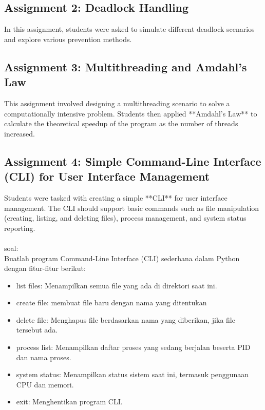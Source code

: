 \documentclass[12pt]{article}
\begin{document}
\subsection{Assignment 2: Deadlock Handling}
In this assignment, students were asked to simulate different deadlock scenarios and explore various prevention methods.

\subsection{Assignment 3: Multithreading and Amdahl's Law}
This assignment involved designing a multithreading scenario to solve a computationally intensive problem. Students then applied **Amdahl's Law** to calculate the theoretical speedup of the program as the number of threads increased.

\subsection{Assignment 4: Simple Command-Line Interface (CLI) for User Interface Management}
Students were tasked with creating a simple **CLI** for user interface management. The CLI should support basic commands such as file manipulation (creating, listing, and deleting files), process management, and system status reporting.\\\\
soal:\\
Buatlah program Command-Line Interface (CLI) sederhana dalam Python dengan fitur-fitur berikut:
\begin{itemize}
    \item list files: Menampilkan semua file yang ada di direktori saat ini.
    \item create file: membuat file baru dengan nama yang ditentukan
    \item delete file: Menghapus file berdasarkan nama yang diberikan, jika file tersebut ada.
    \item process list: Menampilkan daftar proses yang sedang berjalan beserta PID dan nama proses.
    \item system status: Menampilkan status sistem saat ini, termasuk penggunaan CPU dan memori.
    \item exit: Menghentikan program CLI.
\end{itemize}
\end{document}
